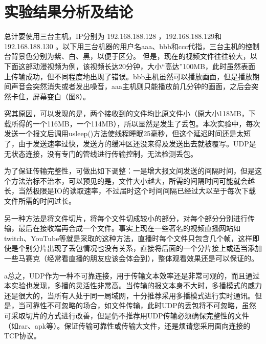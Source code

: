 \documentclass[UTF8]{ctexart}
\begin{document}
\section{实验结果分析及结论}
总计要使用三台主机，IP分别为 192.168.188.128 ，192.168.188.129和192.168.188.130 。以下用三台机器的用户名aaa、bbb和ccc代指，三台主机的控制台背景色分别为紫、白、黑，以便于区分。
但是，现在的视频文件往往较大，以下面这部动漫视频为例，该视频长达20分钟，大小“高达”100MB，此时虽然表面上传输成功，但不同程度地出现了错误。bbb主机虽然可以播放画面，但是播放期间声音会突然消失或者发出噪音，aaa主机则只能播放前几分钟的画面，之后会突然卡住，屏幕变白（图8）。
\par
究其原因，可以发现的是，两个接收到的文件均比原文件小（原大小118MB，下载所得的一个116MB，一个114MB），所以显然是发生了丢包。本次实验中，每次发送一个报文后调用usleep()方法使线程睡眠25毫秒，但这个延迟时间还是太短了，由于发送速率过快，发送方的缓冲区还没来得及发送出去就被覆写。UDP是无状态连接，没有专门的管线进行传输控制，无法检测丢包。
\par
为了保证传输完整性，可做出如下调整：一是增大报文间发送的间隔时间，但是这个方法治标不治本，可以预见的是，文件大小越大，所需的间隔时间可能就会越长，当然极限是IO的读取速率，不过届时这个时间间隔已经过大以至于每次下载文件所需的时间过长。
\par
另一种方法是将文件切片，将每个文件切成较小的部分，对每个部分分别进行传输，最后在接收端再合成一个文件。事实上现在一些著名的视频直播网站如twitch、YouTube等就是采取的这种方法，直播时每个文件只包含几个帧，这样即使是个别分片出现了丢包情况也没有关系，直接将后面的一个分片接上或适当添加一些马赛克（经常看直播的朋友应该会体会到），整体观看效果还是可以保证的。
\par
a总之，UDP作为一种不可靠连接，用于传输文本效率还是非常可观的，而且通过本实验也发现，多播的灵活性非常高。当传输的报文本身不大时，多播模式的威力还是很大的，当所有人处于同一局域网，十分推荐采用多播模式进行实时通讯。但是，当可靠性不可忽略的场合，如文件传输，此时UDP的丢包将不可忽略，虽然可采取切片的方式进行改善，但是仍不推荐用UDP传输必须确保完整性的文件（如rar、apk等）。保证传输可靠性或传输大文件，还是烦请您采用面向连接的TCP协议。


\end{document}
